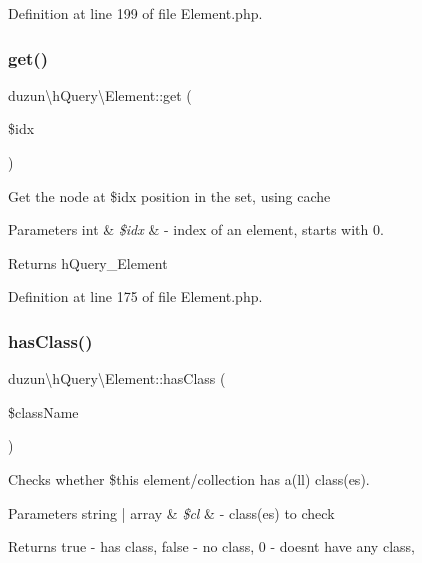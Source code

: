 Definition at line 199 of file Element.\+php.

\mbox{\label{classduzun_1_1hQuery_1_1Element_aa629dd31a0d9ced799f65e4bd7c0b0f3}} 
\subsubsection{\texorpdfstring{get()}{get()}}
{\footnotesize\ttfamily duzun\textbackslash{}h\+Query\textbackslash{}\+Element\+::get (\begin{DoxyParamCaption}\item[{}]{\$idx }\end{DoxyParamCaption})}

Get the node at \$idx position in the set, using cache


\begin{DoxyParams}[1]{Parameters}
int & {\em \$idx} & -\/ index of an element, starts with 0.\\
\hline
\end{DoxyParams}
\begin{DoxyReturn}{Returns}
h\+Query\+\_\+\+Element 
\end{DoxyReturn}


Definition at line 175 of file Element.\+php.

\mbox{\label{classduzun_1_1hQuery_1_1Element_a0791de5ec50b8d91dacca06ee2074364}} 
\subsubsection{\texorpdfstring{has\+Class()}{hasClass()}}
{\footnotesize\ttfamily duzun\textbackslash{}h\+Query\textbackslash{}\+Element\+::has\+Class (\begin{DoxyParamCaption}\item[{}]{\$class\+Name }\end{DoxyParamCaption})}

Checks whether \$this element/collection has a(ll) class(es).


\begin{DoxyParams}[1]{Parameters}
string | array & {\em \$cl} & -\/ class(es) to check \\
\hline
\end{DoxyParams}
\begin{DoxyReturn}{Returns}
true -\/ has class, false -\/ no class, 0 -\/ doesn\textquotesingle{}t have any class, 
\end{DoxyReturn}


